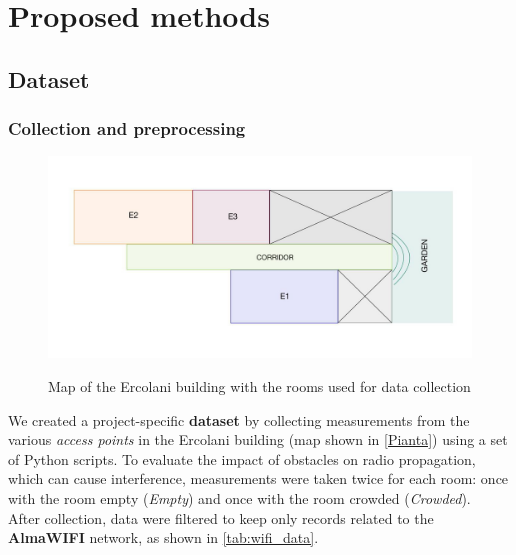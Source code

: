 \documentclass{article}
\begin{document}
\section{Proposed methods}
\subsection{Dataset}
\subsubsection{Collection and preprocessing}
\begin{figure}[ht!]
    \centering
    {\includegraphics[scale=0.28]{img/piantinaErcolani.JPG}}
    \caption{Map of the Ercolani building with the rooms used for data collection}
    \label{Pianta}
\end{figure}
We created a project-specific \textbf{dataset} by collecting measurements from the various \textit{access points} in the Ercolani building (map shown in \autoref{Pianta}) using a set of Python scripts.
To evaluate the impact of obstacles on radio propagation, which can cause interference, measurements were taken twice for each room: once with the room empty (\textit{Empty}) and once with the room crowded (\textit{Crowded}).\\
After collection, data were filtered to keep only records related to the \textbf{AlmaWIFI} network, as shown in \autoref{tab:wifi_data}.
\end{document}

